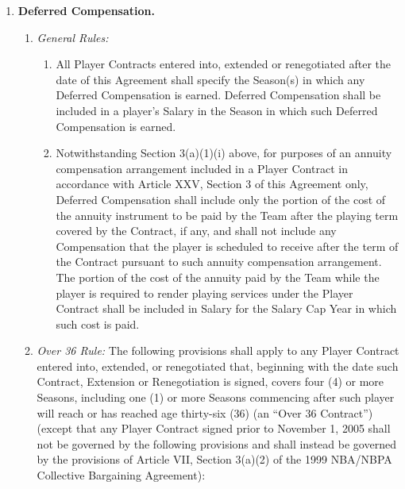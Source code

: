 \documentclass[
]{book}
\providecommand{\tightlist}{%
  \setlength{\itemsep}{0pt}\setlength{\parskip}{0pt}}
\begin{document}
\begin{enumerate}
\def\labelenumi{(\alph{enumi})}
\tightlist
\item
  \textbf{Deferred Compensation.}

  \begin{enumerate}
  \def\labelenumii{(\arabic{enumii})}
  \tightlist
  \item
    \emph{General Rules:}

    \begin{enumerate}
    \def\labelenumiii{(\roman{enumiii})}
    \tightlist
    \item
      All Player Contracts entered into, extended or renegotiated after the date of this Agreement shall specify the Season(s) in which any Deferred Compensation is earned. Deferred Compensation shall be included in a player's Salary in the Season in which such Deferred Compensation is earned.
    \item
      Notwithstanding Section 3(a)(1)(i) above, for purposes of an annuity compensation arrangement included in a Player Contract in accordance with Article XXV, Section 3 of this Agreement only, Deferred Compensation shall include only the portion of the cost of the annuity instrument to be paid by the Team after the playing term covered by the Contract, if any, and shall not include any Compensation that the player is scheduled to receive after the term of the Contract pursuant to such annuity compensation arrangement. The portion of the cost of the annuity paid by the Team while the player is required to render playing services under the Player Contract shall be included in Salary for the Salary Cap Year in which such cost is paid.
    \end{enumerate}
  \item
    \emph{Over 36 Rule:} The following provisions shall apply to any Player Contract entered into, extended, or renegotiated that, beginning with the date such Contract, Extension or Renegotiation is signed, covers four (4) or more Seasons, including one (1) or more Seasons commencing after such player will reach or has reached age thirty-six (36) (an ``Over 36 Contract'') (except that any Player Contract signed prior to November 1, 2005 shall not be governed by the following provisions and shall instead be governed by the provisions of Article VII, Section 3(a)(2) of the 1999 NBA/NBPA Collective Bargaining Agreement):


\end{enumerate}
\end{enumerate}
\end{document}

